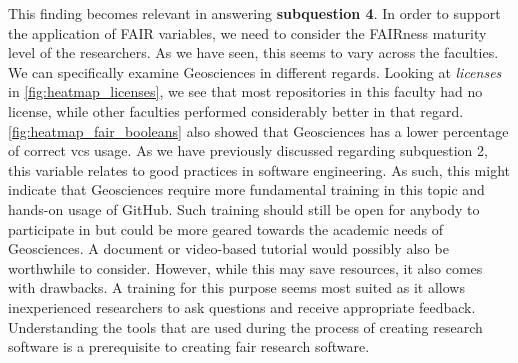 This finding becomes relevant in answering \textbf{subquestion 4}. In order to support the application of FAIR variables, we need to consider the FAIRness maturity level of the researchers. As we have seen, this seems to vary across the faculties. We can specifically examine Geosciences in different regards. Looking at \textit{licenses} in \autoref{fig:heatmap_licenses}, we see that most repositories in this faculty had no license, while other faculties performed considerably better in that regard. \autoref{fig:heatmap_fair_booleans} also showed that Geosciences has a lower percentage of correct vcs usage. As we have previously discussed regarding subquestion 2, this variable relates to good practices in software engineering. As such, this might indicate that Geosciences require more fundamental training in this topic and hands-on usage of GitHub. Such training should still be open for anybody to participate in but could be more geared towards the academic needs of Geosciences. A document or video-based tutorial would possibly also be worthwhile to consider. However, while this may save resources, it also comes with drawbacks. A training for this purpose seems most suited as it allows inexperienced researchers to ask questions and receive appropriate feedback. Understanding the tools that are used during the process of creating research software is a prerequisite to creating \acrshort{fair} research software. 

